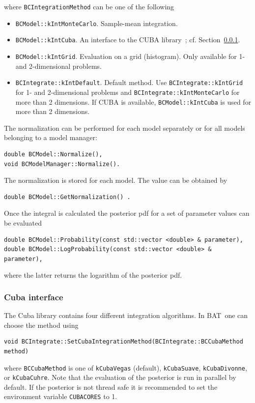 \documentclass[11pt, a4paper]{article}
\newcommand{\bat}{{\sc BAT}}
\newcommand{\BAT}{\bat}
\begin{document}
where \verb|BCIntegrationMethod| can be one of the following
%
\begin{itemize}
\item \verb|BCModel::kIntMonteCarlo|. Sample-mean integration.
\item \verb|BCModel::kIntCuba|. An interface to the CUBA
  library~\cite{CUBA,CUBAweb}; cf. Section~\ref{section:cubainterface}.
\item \verb|BCModel::kIntGrid|. Evaluation on a grid (histogram). Only
  available for 1- and 2-dimensional problems.
\item \verb|BCIntegrate::kIntDefault|. Default method. Use
  \verb|BCIntegrate::kIntGrid| for 1- and 2-dimensional problems and
  \verb|BCIntegrate::kIntMonteCarlo| for more than 2 dimensions. If
  CUBA is available, \verb|BCModel::kIntCuba| is used for more than 2
  dimensions.
\end{itemize}
%

The normalization can be performed for each model separately or for
all models belonging to a model manager:
%
\begin{verbatim}
double BCModel::Normalize(),
void BCModelManager::Normalize().
\end{verbatim}
%
The normalization is stored for each model. The value can be obtained
by
%
\begin{verbatim}
double BCModel::GetNormalization() .
\end{verbatim}

Once the integral is calculated the posterior pdf for a set of
parameter values can be evaluated
%
\begin{verbatim}
double BCModel::Probability(const std::vector <double> & parameter),
double BCModel::LogProbability(const std::vector <double> & parameter),
\end{verbatim}
%
where the latter returns the logarithm of the posterior pdf.

\subsubsection{Cuba interface}
\label{section:cubainterface}

The Cuba library contains four different integration algorithms. In \BAT\
one can choose the method using
%
\begin{verbatim}
void BCIntegrate::SetCubaIntegrationMethod(BCIntegrate::BCCubaMethod method)
\end{verbatim}
%
where \verb|BCCubaMethod| is one of \verb|kCubaVegas| (default),
\verb|kCubaSuave|, \verb|kCubaDivonne|, or \verb|kCubaCuhre|. Note
that the evaluation of the posterior is run in parallel by default. If
the posterior is not thread safe it is recommended to set the
environment variable \verb|CUBACORES| to 1.
\end{document}
